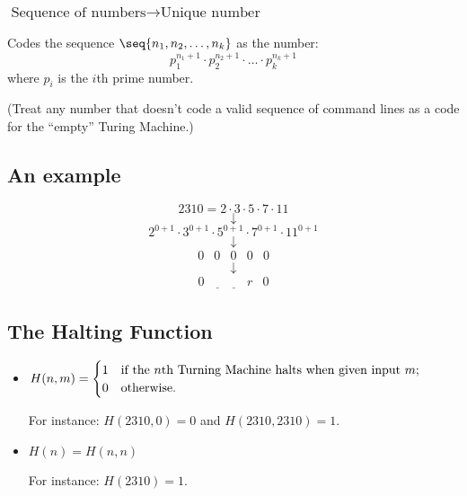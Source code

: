 \documentclass[12pt]{extarticle}
\newcommand{\ub}{\ensuremath{\underline{\enspace}}}
\begin{document}
\subsubsection*{$ \text{Sequence of numbers} \rightarrow  \text{Unique number}$}

Codes the sequence  \(\seq{n_1, n_2, \ldots, n_k}\) as the number: \[p_{1}^{n_{1}+1}\cdot p_2^{n_2+1}\cdot\ldots\cdot p_k^{n_k+1}\] where \(p_i\) is the \(i\)th prime number.  

\vspace{5mm}
\noindent
(Treat any number that doesn't code a valid sequence of command lines as a code for the ``empty'' Turing Machine.) 




\subsection{An example}



$$2310 = 2\cdot 3\cdot 5\cdot 7\cdot 11$$
$$\downarrow$$
$$ 2^{0+1}\cdot 3^{0+1}\cdot 5^{0+1}\cdot 7^{0+1}\cdot 11^{0+1}$$
$$\downarrow$$
\[
\begin{array}{ccccc}
0 & 0 & 0 &0 &0\end{array}
\]
$$\downarrow$$
\[
\begin{array}{ccccc}
0 &\ub &\ub &r &0\end{array}
\]





\subsection{The Halting Function}


\begin{itemize}

\item $
H(n,m) =
\begin{cases}
1 \text{\quad if the \(n\)th Turning Machine halts when given input \(m\);}\\
0 \text{\quad otherwise.}
\end{cases}$
\vspace{1mm}

For instance: $H(2310, 0)=0$ and $H(2310, 2310)=1$.


\vspace{2mm}

\item$H(n) = H(n,n)$

\vspace{2mm}

For instance: $H(2310)=1$.
 
 \end{itemize}
\end{document}
